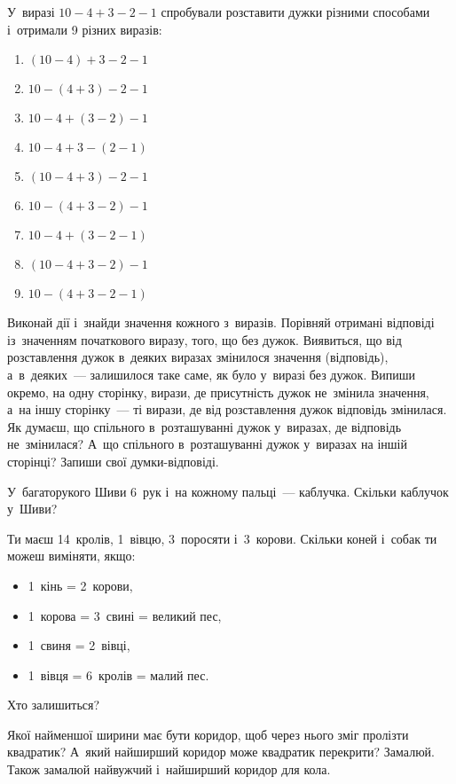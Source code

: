 \problem
{}
У~виразі $10 - 4 + 3 - 2 - 1$ спробували розставити дужки різними способами
і~отримали 9 різних виразів:
\begin{multicols}{2}
  \begin{enumerate}
    \item $(10 - 4) + 3 - 2 - 1$
    \item $10 - (4 + 3) - 2 - 1$
    \item $10 - 4 + (3 - 2) - 1$
    \item $10 - 4 + 3 - (2 - 1)$
    \item $(10 - 4 + 3) - 2 - 1$
    \item $10 - (4 + 3 - 2) - 1$
    \item $10 - 4 + (3 - 2 - 1)$
    \item $(10 - 4 + 3 - 2) - 1$
    \item $10 - (4 + 3 - 2 - 1)$
  \end{enumerate}
\end{multicols}
Виконай дії і~знайди значення кожного з~виразів.
Порівняй отримані відповіді із~значенням початкового виразу,
того, що без дужок.
Виявиться, що від розставлення дужок в~деяких виразах змінилося
значення (відповідь), а~в~деяких~--- залишилося таке саме,
як було у~виразі без дужок.
Випиши окремо, на одну сторінку, вирази, де присутність дужок
не~змінила значення, а~на іншу сторінку~--- ті вирази,
де від розставлення дужок відповідь змінилася.
Як думаєш, що спільного в~розташуванні дужок у~виразах,
де відповідь не~змінилася?
А~що спільного в~розташуванні дужок у~виразах на іншій сторінці?
Запиши свої думки-відповіді.


\problem
У~багаторукого Шиви 6~рук і~на кожному пальці~--- каблучка.
Скільки каблучок у~Шиви?


\problem
Ти маєш 14~кролів, 1~вівцю, 3~поросяти і~3~корови.
Скільки коней і~собак ти можеш виміняти, якщо:
\begin{itemize}
  \item 1~кінь = 2~корови,
  \item 1~корова = 3~свині = великий пес,
  \item 1~свиня = 2~вівці,
  \item 1~вівця = 6~кролів = малий пес.
\end{itemize}
Хто залишиться?


\problem
Якої найменшої ширини має бути коридор,
щоб через нього зміг пролізти квадратик?
А~який найширший коридор може квадратик перекрити?
Замалюй. Також замалюй найвужчий і~найширший коридор для кола.


